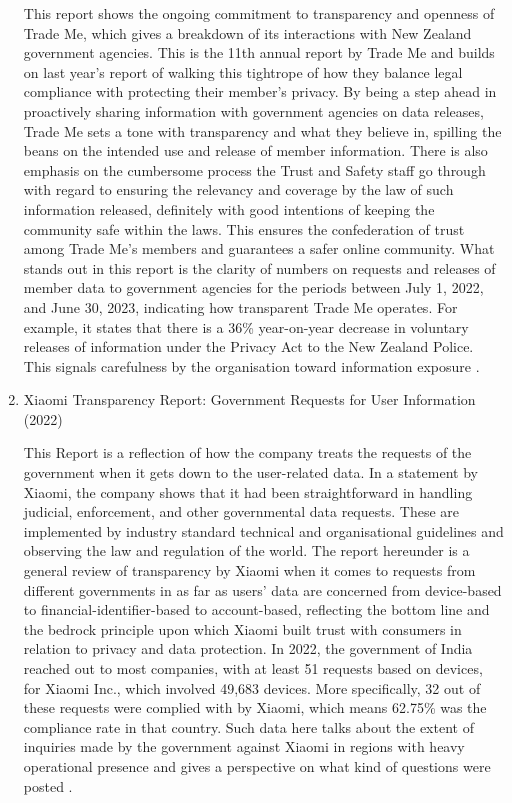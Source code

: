 \begin{enumerate}
This report shows the ongoing commitment to transparency and openness of Trade Me, which gives a breakdown of its interactions with New Zealand government agencies. This is the 11th annual report by Trade Me and builds on last year's report of walking this tightrope of how they balance legal compliance with protecting their member's privacy. By being a step ahead in proactively sharing information with government agencies on data releases, Trade Me sets a tone with transparency and what they believe in, spilling the beans on the intended use and release of member information. There is also emphasis on the cumbersome process the Trust and Safety staff go through with regard to ensuring the relevancy and coverage by the law of such information released, definitely with good intentions of keeping the community safe within the laws. This ensures the confederation of trust among Trade Me's members and guarantees a safer online community. What stands out in this report is the clarity of numbers on requests and releases of member data to government agencies for the periods between July 1, 2022, and June 30, 2023, indicating how transparent Trade Me operates. For example, it states that there is a 36\% year-on-year decrease in voluntary releases of information under the Privacy Act to the New Zealand Police. This signals carefulness by the organisation toward information exposure \cite{TradeMeTransparencyReport2023}.

\item Xiaomi Transparency Report: Government Requests for User Information (2022)

This Report is a reflection of how the company treats the requests of the government when it gets down to the user-related data. In a statement by Xiaomi, the company shows that it had been straightforward in handling judicial, enforcement, and other governmental data requests. These are implemented by industry standard technical and organisational guidelines and observing the law and regulation of the world. The report hereunder is a general review of transparency by Xiaomi when it comes to requests from different governments in as far as users' data are concerned from device-based to financial-identifier-based to account-based, reflecting the bottom line and the bedrock principle upon which Xiaomi built trust with consumers in relation to privacy and data protection. In 2022, the government of India reached out to most companies, with at least 51 requests based on devices, for Xiaomi Inc., which involved 49,683 devices. More specifically, 32 out of these requests were complied with by Xiaomi, which means 62.75\% was the compliance rate in that country. Such data here talks about the extent of inquiries made by the government against Xiaomi in regions with heavy operational presence and gives a perspective on what kind of questions were posted \cite{XiaomiTransparencyReport}.
 

\end{enumerate}
